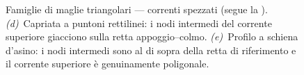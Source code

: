 \begin{figure}[!htbp]
{\begin{tikzpicture}
	\end{tikzpicture}}
	\caption{Famiglie di maglie triangolari --- correnti spezzati
		(segue la ).
		\emph{(d)}~Capriata a puntoni rettilinei: i nodi
		intermedi del corrente superiore giacciono sulla
		retta appoggio--colmo.
		\emph{(e)}~Profilo a schiena d'asino: i nodi
		intermedi sono al di sopra della retta di
		riferimento e il corrente superiore è
		genuinamente poligonale.}
	\label{fig:capriate_spezzato}
\end{figure}
